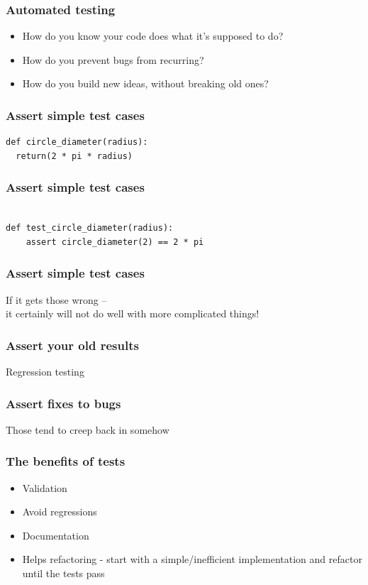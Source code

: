 \documentclass{beamer}
\begin{document}
\begin{frame}
\frametitle{Automated testing}
\begin{itemize}
\pause
\item
How do you know your code does what it's supposed to do?
\pause
\item
How do you prevent bugs from recurring?
\item
\pause 
How do you build new ideas, without breaking old ones?
\end{itemize}
\end{frame}

\begin{frame}[fragile]
\frametitle{Assert simple test cases}
\begin{lstlisting}
def circle_diameter(radius):
  return(2 * pi * radius)
\end{lstlisting}
\end{frame}

\begin{frame}[fragile]
\frametitle{Assert simple test cases}
\begin{lstlisting}

def test_circle_diameter(radius):
    assert circle_diameter(2) == 2 * pi

\end{lstlisting}
\end{frame}

\begin{frame}[fragile]
\frametitle{Assert simple test cases}
If it gets those wrong -- 
\\ 
it certainly will not do well with more complicated things!
\end{frame}


\begin{frame}[fragile]
\frametitle{Assert your old results}

Regression testing

\end{frame}


\begin{frame}[fragile]
\frametitle{Assert fixes to bugs}

Those tend to creep back in somehow 

\end{frame}



\begin{frame}
\frametitle{The benefits of tests}
\begin{itemize}
\pause
\item
Validation
\pause
\item
Avoid regressions
\pause
\item
Documentation
\pause
\item
Helps refactoring - start with a simple/inefficient implementation and refactor
until the tests pass
\end{itemize}
\end{frame}
\end{document}
